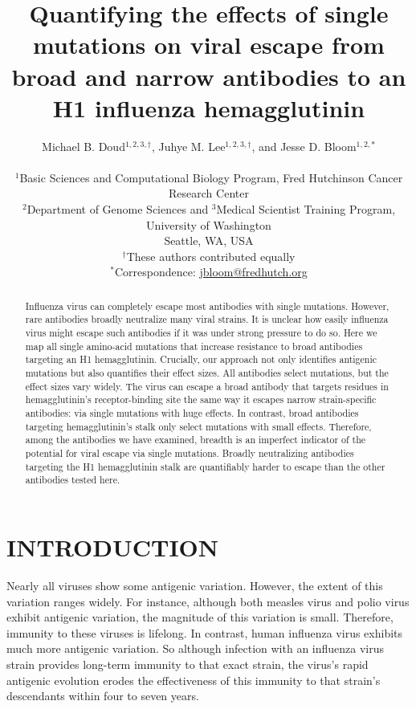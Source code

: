 \documentclass[11pt]{article}
\title{Quantifying the effects of single mutations on viral escape from broad and narrow antibodies to an H1 influenza hemagglutinin}
\author
{Michael B. Doud$^{1,2,3,\dagger}$, Juhye M. Lee$^{1,2,3,\dagger}$, and Jesse D. Bloom$^{1,2,*}$\\
\\
\scriptsize{$^1$Basic Sciences and Computational Biology Program, Fred Hutchinson Cancer Research Center}\\
\scriptsize{$^2$Department of Genome Sciences and $^3$Medical Scientist Training Program, University of Washington} \\
\scriptsize{Seattle, WA, USA} \\
\scriptsize{$^{\dagger}$These authors contributed equally} \\
\scriptsize{$^*$Correspondence: \href{jbloom@fredhutch.org}{jbloom@fredhutch.org}}
}
\date{}
\begin{document}
\maketitle
\onehalfspacing

\begin{abstract}
Influenza virus can completely escape most antibodies with single mutations.
However, rare antibodies broadly neutralize many viral strains.
It is unclear how easily influenza virus might escape such antibodies if it was under strong pressure to do so.
Here we map all single amino-acid mutations that increase resistance to broad antibodies targeting an H1 hemagglutinin.
Crucially, our approach not only identifies antigenic mutations but also quantifies their effect sizes.
All antibodies select mutations, but the effect sizes vary widely. 
The virus can escape a broad antibody that targets residues in hemagglutinin's receptor-binding site the same way it escapes narrow strain-specific antibodies: via single mutations with huge effects.   
In contrast, broad antibodies targeting hemagglutinin's stalk only select mutations with small effects. 
Therefore, among the antibodies we have examined, breadth is an imperfect indicator of the potential for viral escape via single mutations.
Broadly neutralizing antibodies targeting the H1 hemagglutinin stalk are quantifiably harder to escape than the other antibodies tested here.
\end{abstract}

\section*{INTRODUCTION}
Nearly all viruses show some antigenic variation.
However, the extent of this variation ranges widely.
For instance, although both measles virus\cite{birrer1981antigenic,ter1981antigenic} and polio virus\cite{crainic1983natural,diamond1985antigenic,drexler2014robustness} exhibit antigenic variation, the magnitude of this variation is small. 
Therefore, immunity to these viruses is lifelong\cite{panum1847iagttagelser,salk1984one}.
In contrast, human influenza virus exhibits much more antigenic variation.
So although infection with an influenza virus strain provides long-term immunity to that exact strain\cite{fluinboardingschool1978,davies1982christ,yu2008neutralizing}, the virus's rapid antigenic evolution erodes the effectiveness of this immunity to that strain's descendants within four to seven years\cite{couch1983immunity}.
\end{document}
